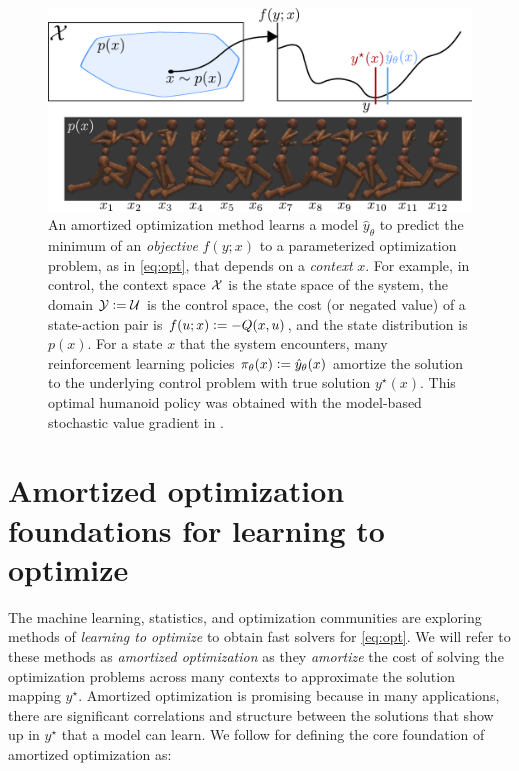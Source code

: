 \documentclass[twoside,11pt]{article}
\begin{document}
\begin{figure}[t]
  \centering
  \includegraphics[width=\textwidth]{fig/overview.pdf}
  \caption{An amortized optimization method learns
    a model $\hat y_\theta$ to predict the minimum
    of an \emph{objective} $f(y;x)$ to a parameterized
    optimization problem, as in \cref{eq:opt}, that depends on
    a \emph{context} $x$.
    For example, in control,
    the context space ${\mathcal{X}}$ is the state space of the system,
    the domain ${\mathcal{Y}}\vcentcolon={\mathcal{U}}$ is the control space,
    the cost (or negated value) of a state-action
    pair is $f(u; x)\vcentcolon= -Q(x,u)$, and the state distribution is $p(x)$.
    For a state $x$ that the system encounters,
    many reinforcement learning policies $\pi_\theta(x)\vcentcolon=\hat y_\theta(x)$
    amortize the solution to the underlying control problem
    with true solution $y^\star(x)$.
    This optimal humanoid policy was obtained with the model-based
    stochastic value gradient in \citet{amos2021model}.
  }
  \label{fig:overview}
\end{figure}

\section{Amortized optimization foundations for learning to optimize}
The machine learning, statistics, and optimization
communities are exploring methods of \emph{learning
to optimize} to obtain fast solvers for \cref{eq:opt}.
We will refer to these methods as \emph{amortized optimization}
as they \emph{amortize} the cost of solving the
optimization problems across many contexts to approximate
the solution mapping $y^\star$.
Amortized optimization is promising because in many applications,
there are significant correlations and structure between the
solutions that show up in $y^\star$ that a model can learn.
We follow \citet{shu2017amortized} for defining the core
foundation of amortized optimization as:
\end{document}
